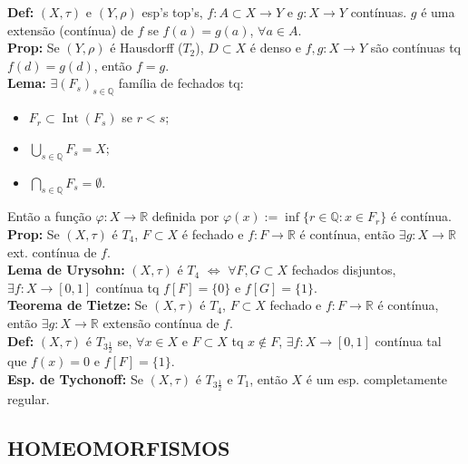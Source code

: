 \documentclass{article}
\begin{document}
\begin{landscape}
\begin{multicols}{3}
\textbf{Def:} $(X, \tau)$ e $(Y, \rho)$ esp's top's, $f: A \subset X \to Y$ e $g: X \to Y$ contínuas. $g$ é uma extensão (contínua) de $f$ se $f(a) = g(a)$, $\forall a \in A$.\\
\textbf{Prop:} Se $(Y, \rho)$ é Hausdorff ($T_2$), $D \subset X$ é denso e $f, g: X \to Y$ são contínuas tq $f(d) = g(d)$, então $f = g$.\\
\textbf{Lema:} $\exists (F_s)_{s \in \mathbb{Q}}$ família de fechados tq:
\begin{itemize}
  \item $F_r \subset \operatorname{Int}(F_s)$ se $r < s$;
  \item $\bigcup_{s \in \mathbb{Q}} F_s = X$;
  \item $\bigcap_{s \in \mathbb{Q}} F_s = \emptyset$.
\end{itemize}
Então a função $\varphi: X \to \mathbb{R}$ definida por $\varphi(x) := \inf \{r \in \mathbb{Q} : x \in F_r\}$ é contínua.\\
\textbf{Prop:} Se $(X, \tau)$ é $T_4$, $F \subset X$ é fechado e $f: F \to \mathbb{R}$ é contínua, então $\exists g: X \to \mathbb{R}$ ext. contínua de $f$.\\
\textbf{Lema de Urysohn:} $(X, \tau)$ é $T_4$ $\Leftrightarrow$ $\forall F, G \subset X$ fechados disjuntos, $\exists f: X \to [0,1]$ contínua tq $f[F] = \{0\}$ e $f[G] = \{1\}$.\\
\textbf{Teorema de Tietze:} Se $(X, \tau)$ é $T_4$, $F \subset X$ fechado e $f: F \to \mathbb{R}$ é contínua, então $\exists g: X \to \mathbb{R}$ extensão contínua de $f$.\\
\textbf{Def:} $(X, \tau)$ é $T_{3\frac{1}{2}}$ se, $\forall x \in X$ e $F \subset X$ tq $x \notin F$, $\exists f: X \to [0,1]$ contínua tal que $f(x) = 0$ e $f[F] = \{1\}$.\\
\textbf{Esp. de Tychonoff:} Se $(X, \tau)$ é $T_{3\frac{1}{2}}$ e $T_1$, então $X$ é um esp. completamente regular.
\end{multicols}
\begin{center}    
\section{HOMEOMORFISMOS}
\end{center}
\begin{multicols}{3}
    

\end{multicols}
\end{landscape}
\end{document}
